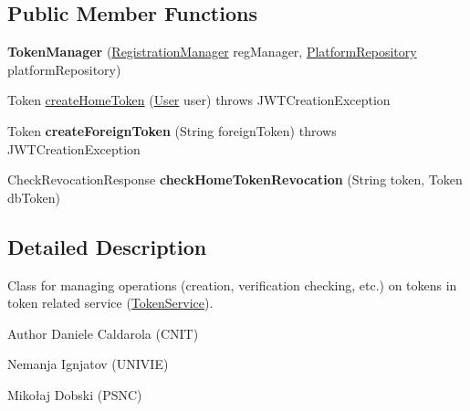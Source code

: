 \subsection*{Public Member Functions}
\begin{DoxyCompactItemize}
\item 
{\bfseries Token\+Manager} (\hyperlink{classeu_1_1h2020_1_1symbiote_1_1security_1_1commons_1_1RegistrationManager}{Registration\+Manager} reg\+Manager, \hyperlink{interfaceeu_1_1h2020_1_1symbiote_1_1security_1_1repositories_1_1PlatformRepository}{Platform\+Repository} platform\+Repository)\hypertarget{classeu_1_1h2020_1_1symbiote_1_1security_1_1commons_1_1TokenManager_a421a9ca8702d476849b8a425dadd9127}{}\label{classeu_1_1h2020_1_1symbiote_1_1security_1_1commons_1_1TokenManager_a421a9ca8702d476849b8a425dadd9127}

\item 
Token \hyperlink{classeu_1_1h2020_1_1symbiote_1_1security_1_1commons_1_1TokenManager_a5f369542764f2b777081e8b071a9a9da}{create\+Home\+Token} (\hyperlink{classeu_1_1h2020_1_1symbiote_1_1security_1_1commons_1_1User}{User} user)  throws J\+W\+T\+Creation\+Exception 
\item 
Token {\bfseries create\+Foreign\+Token} (String foreign\+Token)  throws J\+W\+T\+Creation\+Exception \hypertarget{classeu_1_1h2020_1_1symbiote_1_1security_1_1commons_1_1TokenManager_a40d053bdb0b162a86c5813be3802d722}{}\label{classeu_1_1h2020_1_1symbiote_1_1security_1_1commons_1_1TokenManager_a40d053bdb0b162a86c5813be3802d722}

\item 
Check\+Revocation\+Response {\bfseries check\+Home\+Token\+Revocation} (String token, Token db\+Token)\hypertarget{classeu_1_1h2020_1_1symbiote_1_1security_1_1commons_1_1TokenManager_a169e51ef9a2110174d21baefce1b3309}{}\label{classeu_1_1h2020_1_1symbiote_1_1security_1_1commons_1_1TokenManager_a169e51ef9a2110174d21baefce1b3309}

\end{DoxyCompactItemize}


\subsection{Detailed Description}
Class for managing operations (creation, verification checking, etc.) on tokens in token related service (\hyperlink{}{Token\+Service}).

\begin{DoxyAuthor}{Author}
Daniele Caldarola (C\+N\+IT) 

Nemanja Ignjatov (U\+N\+I\+V\+IE) 

Mikołaj Dobski (P\+S\+NC) 
\end{DoxyAuthor}


